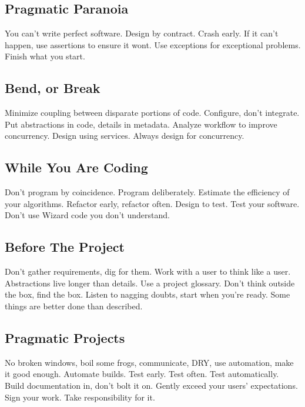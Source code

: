 \subsection{Pragmatic Paranoia}

You can't write perfect software. Design by contract. Crash early. If it can't happen, use assertions to ensure it wont. Use exceptions for exceptional problems. Finish what you start.
\subsection{Bend, or Break}

Minimize coupling between disparate portions of code. Configure, don't integrate. Put abstractions in code, details in metadata. Analyze workflow to improve concurrency. Design using services. Always design for concurrency.

\subsection{While You Are Coding}

Don't program by coincidence. Program deliberately. Estimate the efficiency of your algorithms. Refactor early, refactor often. Design to test. Test your software. Don't use Wizard code you don't understand.

\subsection{Before The Project}

Don't gather requirements, dig for them. Work with a user to think like a user. Abstractions live longer than details. Use a project glossary. Don't think outside the box, find the box. Listen to nagging doubts, start when you're ready. Some things are better done than described.

\subsection{Pragmatic Projects}

No broken windows, boil some frogs, communicate, DRY, use automation, make it good enough. Automate builds. Test early. Test often. Test automatically. Build documentation in, don't bolt it on. Gently exceed your users' expectations. Sign your work. Take responsibility for it. 

\onecolumn
